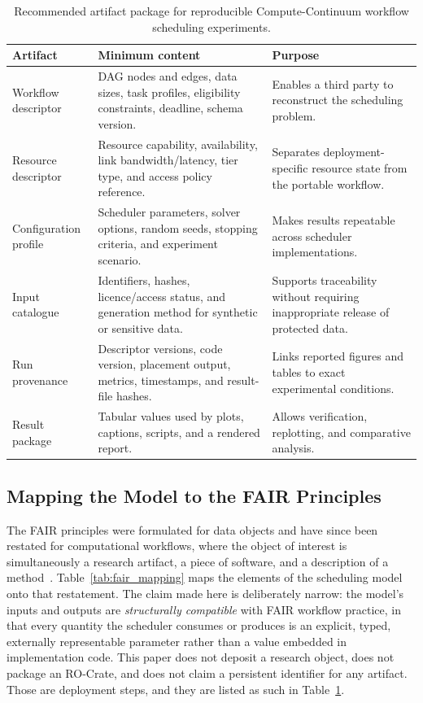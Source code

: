 \begin{table}[t]
\centering
\caption{Recommended artifact package for reproducible Compute-Continuum workflow scheduling experiments.}
\label{tab:artifact_checklist}
\small
\begin{tabular}{|p{}|p{}|p{}|}
\hline
\textbf{Artifact} & \textbf{Minimum content} & \textbf{Purpose} \\
\hline
Workflow descriptor & DAG nodes and edges, data sizes, task profiles, eligibility constraints, deadline, schema version. & Enables a third party to reconstruct the scheduling problem. \\
\hline
Resource descriptor & Resource capability, availability, link bandwidth/latency, tier type, and access policy reference. & Separates deployment-specific resource state from the portable workflow. \\
\hline
Configuration profile & Scheduler parameters, solver options, random seeds, stopping criteria, and experiment scenario. & Makes results repeatable across scheduler implementations. \\
\hline
Input catalogue & Identifiers, hashes, licence/access status, and generation method for synthetic or sensitive data. & Supports traceability without requiring inappropriate release of protected data. \\
\hline
Run provenance & Descriptor versions, code version, placement output, metrics, timestamps, and result-file hashes. & Links reported figures and tables to exact experimental conditions. \\
\hline
Result package & Tabular values used by plots, captions, scripts, and a rendered report. & Allows verification, replotting, and comparative analysis. \\
\hline
\end{tabular}
\end{table}

\subsection{Mapping the Model to the FAIR Principles}
\label{subsec:fair_mapping}

The FAIR principles were formulated for data objects and have since been restated for computational
workflows, where the object of interest is simultaneously a research artifact, a piece of software,
and a description of a method~\cite{wilkinson2016fair,swilkinson2025fairworkflows}.
Table~\ref{tab:fair_mapping} maps the elements of the scheduling model onto that restatement. The
claim made here is deliberately narrow: the model's inputs and outputs are \emph{structurally
compatible} with FAIR workflow practice, in that every quantity the scheduler consumes or produces
is an explicit, typed, externally representable parameter rather than a value embedded in
implementation code. This paper does not deposit a research object, does not package an RO-Crate,
and does not claim a persistent identifier for any artifact. Those are deployment steps, and they
are listed as such in Table~\ref{tab:artifact_checklist}.

